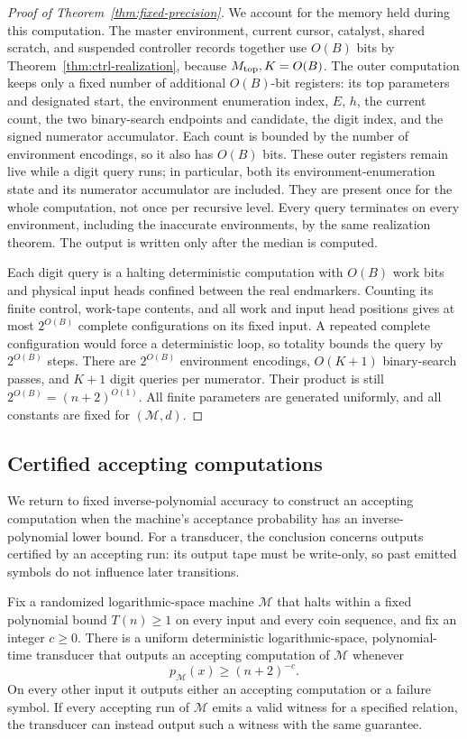 \begin{proof}[Proof of Theorem~\ref{thm:fixed-precision}]
We account for the memory held during this computation. The master
environment, current cursor, catalyst, shared scratch, and suspended
controller records together use $O(B)$ bits by
Theorem~\ref{thm:ctrl-realization}, because $M_{\rm top},K=O(B)$.
The outer computation keeps only a fixed number of additional
$O(B)$-bit registers: its top parameters and designated start,
the environment enumeration index, $E$, $h$, the current count,
the two binary-search endpoints and candidate, the digit index,
and the signed numerator accumulator. Each count is bounded by the
number of environment encodings, so it also has $O(B)$ bits.
These outer registers remain live while a digit query runs; in
particular, both its environment-enumeration state and its numerator
accumulator are included. They are present once for the whole
computation, not once per recursive level. Every query terminates on every environment,
including the inaccurate environments, by the same realization
theorem. The output is written only after the median is computed.

Each digit query is a halting deterministic computation with $O(B)$
work bits and physical input heads confined between the real endmarkers.
Counting its finite control, work-tape contents, and all work and input
head positions gives at most $2^{O(B)}$ complete configurations on its
fixed input. A repeated complete configuration would
force a deterministic loop, so totality bounds the query by
$2^{O(B)}$ steps. There are
$2^{O(B)}$ environment encodings, $O(K+1)$ binary-search passes,
and $K+1$ digit queries per numerator. Their product is still
$2^{O(B)}=(n+2)^{O(1)}$. All finite parameters are generated
uniformly, and all constants are fixed for $(\mathcal M,d)$.
\end{proof}

\subsection{Certified accepting computations}

We return to fixed inverse-polynomial accuracy to construct an accepting
computation when the machine's acceptance probability has an
inverse-polynomial lower bound.
For a transducer, the conclusion concerns outputs certified by an
accepting run: its output tape must be write-only, so past emitted
symbols do not influence later transitions.

\begin{corollary}
\label{cor:certified-search}
Fix a randomized logarithmic-space machine $\mathcal M$ that halts
within a fixed polynomial bound $T(n)\ge1$ on every input and every
coin sequence, and fix an integer $c\ge0$. There is a uniform
deterministic logarithmic-space, polynomial-time transducer that
outputs an accepting computation of $\mathcal M$ whenever
\[
 p_{\mathcal M}(x)\ge(n+2)^{-c}.
\]
On every other input it outputs either an accepting computation or
a failure symbol. If every accepting run of $\mathcal M$ emits a
valid witness for a specified relation, the transducer can instead
output such a witness with the same guarantee.
\end{corollary}

